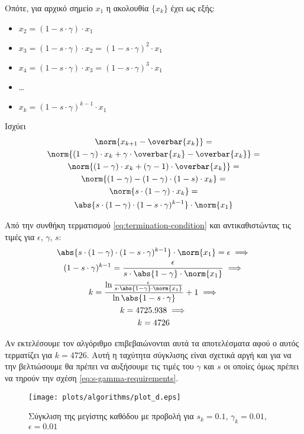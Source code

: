 \begin{varwidth}{\textwidth}
Οπότε, για αρχικό σημείο $x_1$ η ακολουθία $\{x_k\}$ έχει ως εξής:
\begin{itemize}
	\item $x_2 = (1 - s \cdot \gamma) \cdot x_1$
	\item $x_3 = (1 - s \cdot \gamma) \cdot x_2 = (1 - s \cdot \gamma)^2 \cdot x_1$
	\item $x_4 = (1 - s \cdot \gamma) \cdot x_3 = (1 - s \cdot \gamma)^3 \cdot x_1$
	\item \ldots
	\item $x_k = (1 - s \cdot \gamma)^{k-1} \cdot x_1$
\end{itemize}
\end{varwidth}
\hfill \break
\hfill \break

Ισχύει
\begin{gather*}
	\norm{x_{k+1} - \overbar{x_k}} = \\
	\norm{(1-\gamma) \cdot x_k + \gamma \cdot \overbar{x_k} - \overbar{x_k}} = \\
	\norm{ (1-\gamma) \cdot x_k + (\gamma - 1) \cdot \overbar{x_k} } = \\
	\norm{ (1-\gamma) - (1 - \gamma) \cdot (1 -s) \cdot x_k} = \\
	\norm{ s \cdot (1-\gamma) \cdot x_k } = \\
	\abs{s \cdot (1-\gamma) \cdot (1 - s \cdot \gamma)^{k-1}} \cdot \norm{x_1} 
\end{gather*}

Από την συνθήκη τερματισμού \ref{eq:termination-condition} και αντικαθιστώντας τις τιμές για $\epsilon$, $\gamma$, $s$:
\begin{gather*}
	\abs{s \cdot (1-\gamma) \cdot (1 - s \cdot \gamma)^{k-1}} \cdot \norm{x_1} = \epsilon \implies\\
	(1 - s \cdot \gamma) ^ {k - 1} = \frac{\epsilon}{s \cdot \abs{1-\gamma} \cdot \norm{x_1}} \implies\\
	k = \frac{\ln{\frac{\epsilon}{s \cdot \abs{1-\gamma} \cdot \norm{x_1}}}}{\ln{\abs{1 - s \cdot \gamma}}} + 1 \implies\\
	k =  4725.938 \implies\\
	k = 4726
\end{gather*}

Αν εκτελέσουμε τον αλγόριθμο επιβεβαιώνονται αυτά τα αποτελέσματα αφού ο αυτός τερματίζει για $k = 4726$. Αυτή η ταχύτητα σύγκλισης είναι σχετικά αργή και για να την βελτιώσουμε θα πρέπει να αυξήσουμε τις τιμές του $\gamma$ και $s$ οι οποίες όμως πρέπει να τηρούν την σχέση \ref{eq:s-gamma-requirements}.

\begin{figure}[htbp]
	\centerfloat
	\texttt{[image: plots/algorithms/plot\_d.eps]}
	\caption{Σύγκλιση της μεγίστης καθόδου με προβολή για $s_k = 0.1$, $\gamma_k = 0.01$, $\epsilon = 0.01$}
\end{figure}